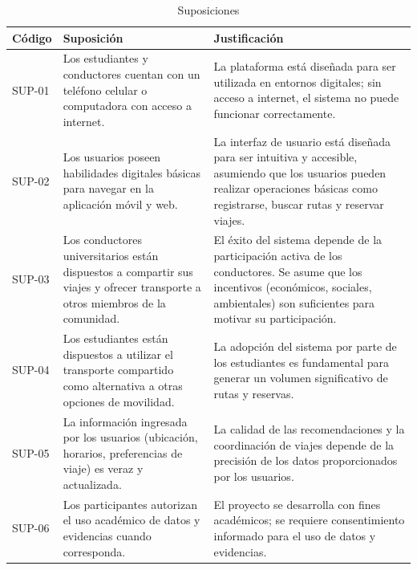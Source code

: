 \documentclass[11pt,a4paper]{article}
\begin{document}
\begin{table}[h]
    \centering
    \caption{Suposiciones}
    \label{tab:suposiciones}
    \vspace{6pt}
    \begin{tabularx}{\textwidth}{|l|X|X|}
    \hline
    \textbf{Código} & \textbf{Suposición} & \textbf{Justificación} \\
    \hline
    SUP-01 & Los estudiantes y conductores cuentan con un teléfono celular o computadora con acceso a internet. & La plataforma está diseñada para ser utilizada en entornos digitales; sin acceso a internet, el sistema no puede funcionar correctamente. \\
    \hline
    SUP-02 & Los usuarios poseen habilidades digitales básicas para navegar en la aplicación móvil y web. & La interfaz de usuario está diseñada para ser intuitiva y accesible, asumiendo que los usuarios pueden realizar operaciones básicas como registrarse, buscar rutas y reservar viajes. \\
    \hline
    SUP-03 & Los conductores universitarios están dispuestos a compartir sus viajes y ofrecer transporte a otros miembros de la comunidad. & El éxito del sistema depende de la participación activa de los conductores. Se asume que los incentivos (económicos, sociales, ambientales) son suficientes para motivar su participación. \\
    \hline
    SUP-04 & Los estudiantes están dispuestos a utilizar el transporte compartido como alternativa a otras opciones de movilidad. & La adopción del sistema por parte de los estudiantes es fundamental para generar un volumen significativo de rutas y reservas. \\
    \hline
    SUP-05 & La información ingresada por los usuarios (ubicación, horarios, preferencias de viaje) es veraz y actualizada. & La calidad de las recomendaciones y la coordinación de viajes depende de la precisión de los datos proporcionados por los usuarios. \\
    \hline
    SUP-06 & Los participantes autorizan el uso académico de datos y evidencias cuando corresponda. & El proyecto se desarrolla con fines académicos; se requiere consentimiento informado para el uso de datos y evidencias. \\
    \hline
    \end{tabularx}
\end{table}
\end{document}
